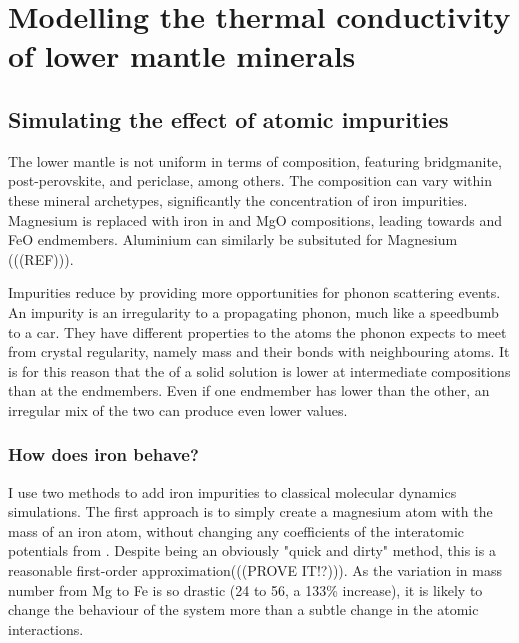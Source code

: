 \chapter{Modelling the thermal conductivity of lower mantle minerals} %

\label{Chapter4} %

\section{Simulating the effect of atomic impurities}

The lower mantle is not uniform in terms of composition, featuring bridgmanite, post-perovskite, and periclase, among others. The composition can vary within these mineral archetypes, significantly the concentration of iron impurities. Magnesium is replaced with iron in 
\mgsios and MgO compositions, leading towards \fesios and FeO endmembers. Aluminium can similarly be subsituted for Magnesium (((REF))).

Impurities reduce \tcs by providing more opportunities for phonon scattering events. An impurity is an irregularity to a propagating phonon, much like a speedbumb to a car. They have different properties to the atoms the phonon expects to meet from crystal regularity, namely mass and their bonds with neighbouring atoms. It is for this reason that the \tcs of a solid solution is lower at intermediate compositions than at the endmembers. Even if one endmember has lower \cs than the other, an irregular mix of the two can produce even lower values.

\subsection{How does iron behave?} 

I use two methods to add iron impurities to classical molecular dynamics simulations. The first approach is to simply create a magnesium atom with the mass of an iron atom, without changing any coefficients of the interatomic potentials from \citet{Oganov2000}. Despite being an obviously "quick and dirty" method, this is a reasonable first-order approximation(((PROVE IT!?))). As the variation in mass number from Mg to Fe is so drastic (24 to 56, a 133\% increase), it is likely to change the behaviour of the system more than a subtle change in the atomic interactions.

